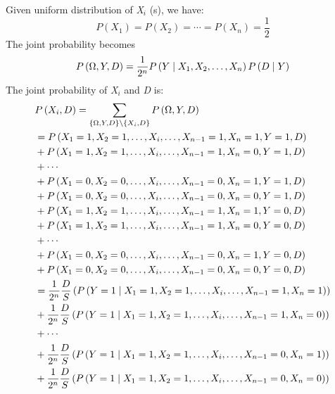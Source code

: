 \documentclass{article}
\numberwithin{equation}{section}
\numberwithin{figure}{section}
\numberwithin{table}{section}
\begin{document}
Given uniform distribution of \textit{X${}_{i}$} (s), we have:
\[P\left(X_1\right)=P\left(X_2\right)=\cdots =P\left(X_n\right)=\frac{1}{2}\] 
The joint probability becomes
\[P\left(\mathrm{\Omega },Y,D\right)=\frac{1}{2^n}P\left(Y\mathrel{\left|\vphantom{Y X_1,X_2,\dots ,X_n}\right.\kern-\nulldelimiterspace}X_1,X_2,\dots ,X_n\right)P\left(D\mathrel{\left|\vphantom{D Y}\right.\kern-\nulldelimiterspace}Y\right)\] 
The joint probability of \textit{X${}_{i}$} and \textit{D} is:
\begin{align*}
&P\left(X_i,D\right)=\sum_{\left\{\mathrm{\Omega },Y,D\right\}\backslash \left\{X_i,D\right\}}{P\left(\mathrm{\Omega },Y,D\right)}\\
&=P\left(X_1=1,X_2=1,\dots ,X_i,\dots ,X_{n-1}=1,X_n=1,Y=1,D\right)\\
&+P\left(X_1=1,X_2=1,\dots ,X_i,\dots ,X_{n-1}=1,X_n=0,Y=1,D\right)\\
&+\cdots \\
&+P\left(X_1=0,X_2=0,\dots ,X_i,\dots ,X_{n-1}=0,X_n=1,Y=1,D\right)\\
&+P\left(X_1=0,X_2=0,\dots ,X_i,\dots ,X_{n-1}=0,X_n=0,Y=1,D\right)\\
&+P\left(X_1=1,X_2=1,\dots ,X_i,\dots ,X_{n-1}=1,X_n=1,Y=0,D\right)\\
&+P\left(X_1=1,X_2=1,\dots ,X_i,\dots ,X_{n-1}=1,X_n=0,Y=0,D\right)\\
&+\cdots \\
&+P\left(X_1=0,X_2=0,\dots ,X_i,\dots ,X_{n-1}=0,X_n=1,Y=0,D\right)\\
&+P\left(X_1=0,X_2=0,\dots ,X_i,\dots ,X_{n-1}=0,X_n=0,Y=0,D\right)\\
&=\frac{1}{2^n}\frac{D}{S}\left(P\left(Y=1\mathrel{\left|\vphantom{Y=1 X_1=1,X_2=1,\dots ,X_i,\dots ,X_{n-1}=1,X_n=1}\right.\kern-\nulldelimiterspace}X_1=1,X_2=1,\dots ,X_i,\dots ,X_{n-1}=1,X_n=1\right)\right)\\
&+\frac{1}{2^n}\frac{D}{S}\left(P\left(Y=1\mathrel{\left|\vphantom{Y=1 X_1=1,X_2=1,\dots ,X_i,\dots ,X_{n-1}=1,X_n=0}\right.\kern-\nulldelimiterspace}X_1=1,X_2=1,\dots ,X_i,\dots ,X_{n-1}=1,X_n=0\right)\right)\\
&+\cdots \\
&+\frac{1}{2^n}\frac{D}{S}\left(P\left(Y=1\mathrel{\left|\vphantom{Y=1 X_1=1,X_2=1,\dots ,X_i,\dots ,X_{n-1}=0,X_n=1}\right.\kern-\nulldelimiterspace}X_1=1,X_2=1,\dots ,X_i,\dots ,X_{n-1}=0,X_n=1\right)\right)\\
&+\frac{1}{2^n}\frac{D}{S}\left(P\left(Y=1\mathrel{\left|\vphantom{Y=1 X_1=1,X_2=1,\dots ,X_i,\dots ,X_{n-1}=0,X_n=0}\right.\kern-\nulldelimiterspace}X_1=1,X_2=1,\dots ,X_i,\dots ,X_{n-1}=0,X_n=0\right)\right)\\

\end{align*}
\end{document}
